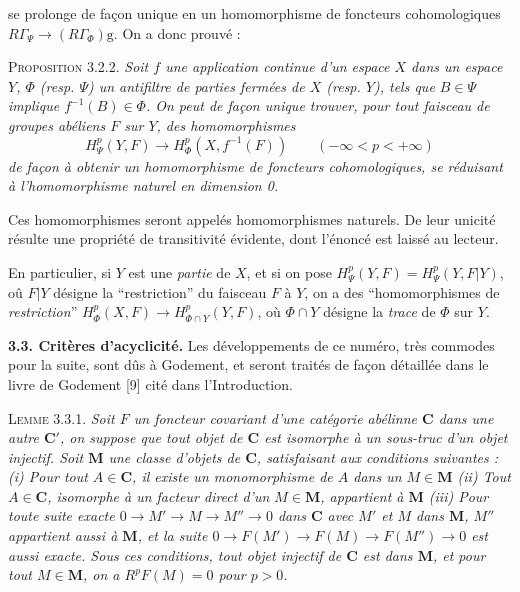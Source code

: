 
\noindent se prolonge de façon unique en un homomorphisme de foncteurs
cohomologiques
$R\Gamma_\Psi\to (R\Gamma_\Phi)\mathrm{g}$.
On a donc prouvé :

\indent\textsc{Proposition 3.2.2.} \textit{Soit $f$ une application continue
d'un espace $X$ dans un espace $Y$, $\Phi$ \textup{(}resp. $\Psi$\textup{)} un antifiltre de
parties fermées de $X$ \textup{(}resp. $Y$\textup{)}, tels que $B\in\Psi$ implique
$f^{-1}(B)\in\Phi$. On peut de façon unique trouver, pour tout faisceau de
groupes abéliens $F$ sur $Y$, des homomorphismes}
\[
H^p_\Psi(Y,F)\to H^p_\Phi(X,f^{-1}(F))
\qquad(-\infty<p<+\infty)
\]
\textit{de façon à obtenir un homomorphisme de foncteurs cohomologiques, se
réduisant à l'homomorphisme naturel en dimension \textup{0}.}

Ces homomorphismes seront appelés homomorphismes naturels. De leur unicité
résulte une propriété de transitivité évidente, dont l'énoncé est laissé au
lecteur.

En particulier, si $Y$ est une \textit{partie} de $X$, et si on pose
$H^p_\Psi(Y,F)=H^p_\Psi(Y,F\vert Y)$, oû $F\vert Y$ désigne la
``restriction'' du faisceau $F$ à $Y$, on a des ``homomorphismes de
\textit{restriction}''
$H^p_\Phi(X,F)\to H^p_{\Phi\cap Y}(Y,F)$,
où $\Phi\cap Y$ désigne la \textit{trace} de $\Phi$ sur $Y$.

\indent\textbf{3.3. Critères d'acyclicité.} Les développements de ce numéro, très
commodes pour la suite, sont dûs à Godement, et seront traités de façon
détaillée dans le livre de Godement [9] cité dans l'Introduction.

\indent\textsc{Lemme 3.3.1.} \textit{Soit $F$ un foncteur covariant d'une
catégorie abélinne $\mathbf C$ dans une autre $\mathbf C'$, on suppose que tout objet de $\mathbf C$
est isomorphe à un sous-truc d'un objet injectif. Soit $\mathbf M$ une classe
d'objets de $\mathbf C$, satisfaisant aux conditions suivantes : \textup{(}i\textup{)} Pour tout
$A\in \mathbf C$, il existe un monomorphisme de $A$ dans un $M\in\mathbf M$ \textup{(}ii\textup{)} Tout
$A\in \mathbf C$, isomorphe à un facteur direct d'un $M\in\mathbf M$, appartient à
$\mathbf M$ \textup{(}iii\textup{)} Pour toute suite exacte
$0\to M'\to M\to M''\to0$
dans $\mathbf C$ avec $M'$ et $M$ dans $\mathbf M$, $M''$ appartient aussi à
$\mathbf M$, et la suite
$0\to F(M')\to F(M)\to
F(M'')\to0$ est aussi exacte. Sous ces conditions, tout objet
injectif de $\mathbf C$ est dans $\mathbf M$, et pour tout $M\in\mathbf M$, on a
$R^pF(M)=0$ pour $p>0$.}

